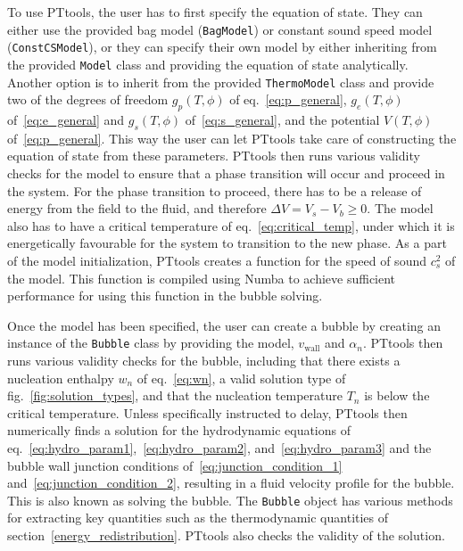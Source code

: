 To use PTtools, the user has to first specify the equation of state.
They can either use the provided bag model (\verb|BagModel|) or constant sound speed model (\verb|ConstCSModel|),
or they can specify their own model by either inheriting from the provided \texttt{Model} class and providing the equation of state analytically.
Another option is to inherit from the provided \verb|ThermoModel| class and provide two of the degrees of freedom $g_p(T,\phi)$ of eq.~\eqref{eq:p_general}, $g_e(T,\phi)$ of~\eqref{eq:e_general} and $g_s(T,\phi)$ of~\eqref{eq:s_general}, and the potential $V(T,\phi)$ of~\eqref{eq:p_general}.
This way the user can let PTtools take care of constructing the equation of state from these parameters.
PTtools then runs various validity checks for the model to ensure that a phase transition will occur and proceed in the system.
For the phase transition to proceed, there has to be a release of energy from the field to the fluid,
and therefore $\Delta V = V_s - V_b \geq 0$.
The model also has to have a critical temperature of eq.~\eqref{eq:critical_temp},
under which it is energetically favourable for the system to transition to the new phase.
As a part of the model initialization, PTtools creates a function for the speed of sound $c_s^2$ of the model.
This function is compiled using Numba to achieve sufficient performance for using this function in the bubble solving.

Once the model has been specified,
the user can create a bubble by creating an instance of the \verb|Bubble| class by providing the model, $v_\text{wall}$ and $\alpha_n$.
PTtools then runs various validity checks for the bubble,
including that there exists a nucleation enthalpy $w_n$ of eq.~\eqref{eq:wn}, a valid solution type of fig.~\ref{fig:solution_types},
and that the nucleation temperature $T_n$ is below the critical temperature.
Unless specifically instructed to delay,
PTtools then numerically finds a solution for the hydrodynamic equations of eq.~\eqref{eq:hydro_param1},~\eqref{eq:hydro_param2}, and~\eqref{eq:hydro_param3} and the bubble wall junction conditions of~\eqref{eq:junction_condition_1} and~\eqref{eq:junction_condition_2},
resulting in a fluid velocity profile for the bubble.
This is also known as solving the bubble.
The \verb|Bubble| object has various methods for extracting key quantities such as the thermodynamic quantities of section~\ref{energy_redistribution}.
PTtools also checks the validity of the solution.

